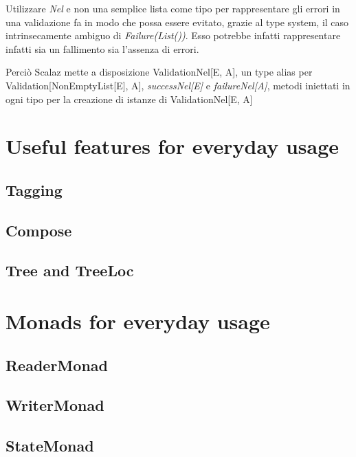 

Utilizzare \textit{Nel} e non una semplice lista come tipo per rappresentare gli errori in una validazione fa in modo che possa essere evitato, grazie al type system, il caso intrinsecamente ambiguo di \textit{Failure(List())}. Esso potrebbe infatti rappresentare infatti sia un fallimento sia l'assenza di errori.

Perciò Scalaz mette a disposizione ValidationNel[E, A], un type alias per Validation[NonEmptyList[E], A], \textit{successNel[E]} e \textit{failureNel[A]}, metodi iniettati in ogni tipo per la creazione di istanze di ValidationNel[E, A]




\section{Useful features for everyday usage}

\subsection{Tagging}

\subsection{Compose}

\subsection{Tree and TreeLoc}


\section{Monads for everyday usage}

\subsection{ReaderMonad}

\subsection{WriterMonad}

\subsection{StateMonad}
